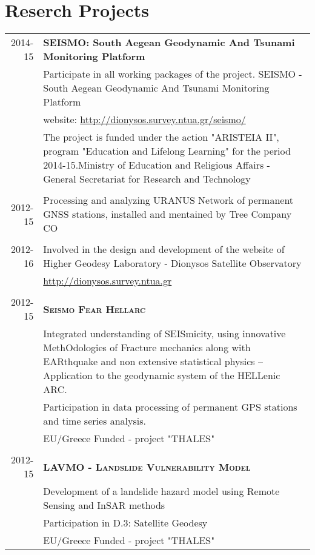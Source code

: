 \documentclass[a4paper]{Classes/cv_prof_en} %
\begin{document}
\section{Reserch Projects}
\begin{longtable}{r|p{15cm}}

\textsc{}2014-15 & \bf{SEISMO: South Aegean Geodynamic And Tsunami Monitoring Platform}\\
			& Participate in all working packages of the project. SEISMO - South Aegean Geodynamic And Tsunami Monitoring Platform\\
			& website: \url{http://dionysos.survey.ntua.gr/seismo/}\\
			& The project is funded under the action "ARISTEIA II", program "Education and Lifelong Learning" for the period 2014-15.Ministry of Education and Religious Affairs - General Secretariat for Research and Technology\\
\multicolumn{2}{c}{} \\
\textsc{}2012-15 & Processing and analyzing URANUS Network of permanent GNSS stations, installed and mentained by Tree Company CO\\
\multicolumn{2}{c}{} \\
\textsc{}2012-16 & Involved in the design and development of the website of Higher Geodesy Laboratory - Dionysos Satellite Observatory\\
			& \url{http://dionysos.survey.ntua.gr}\\
\multicolumn{2}{c}{} \\
\textsc{}2012-15 & \textsc{\bf Seismo Fear Hellarc}\\
			& Integrated understanding of SEISmicity, using innovative MethOdologies of Fracture mechanics along with EARthquake and non extensive statistical physics – Application to the geodynamic system of the HELLenic ARC.\\
			& Participation in data processing of permanent GPS stations and time series analysis.\\
			& EU/Greece Funded - project "THALES"\\
\multicolumn{2}{c}{} \\ 
\textsc{}2012-15 & \textsc{\bf LAVMO - Landslide Vulnerability Model}\\
			& Development of a landslide hazard model using Remote Sensing and InSAR methods\\
			& Participation in D.3: Satellite Geodesy\\
			& EU/Greece Funded - project "THALES"\\

\end{longtable}
\end{document}
